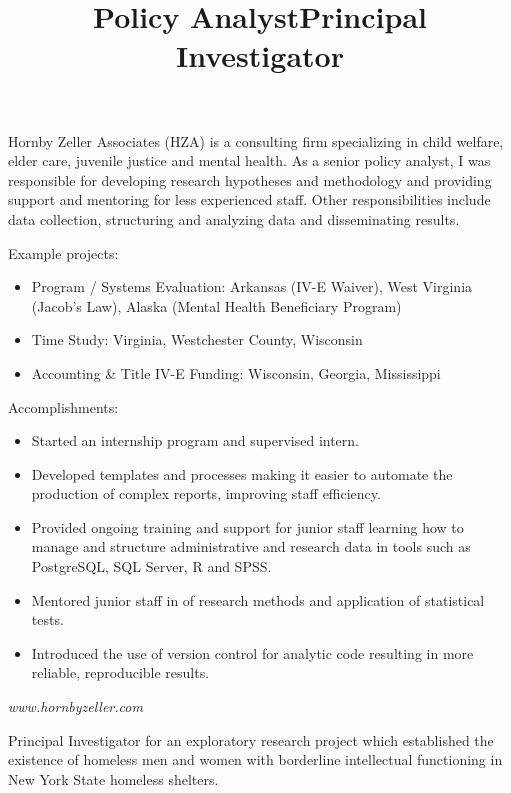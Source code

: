 \documentclass[line, margin, 10pt]{res}
\begin{document}
\begin{resume}
  \title{Policy Analyst}
  \begin{position}
    Hornby Zeller Associates (HZA) is a consulting firm specializing
    in child welfare, elder care, juvenile justice and mental
    health. As a senior policy analyst, I was responsible for
    developing research hypotheses and methodology and providing
    support and mentoring for less experienced staff. Other
    responsibilities include data collection, structuring and
    analyzing data and disseminating results.

    Example projects:
    \begin{itemize}
    \item Program / Systems Evaluation: Arkansas (IV-E Waiver), West
      Virginia (Jacob's Law), Alaska (Mental Health Beneficiary Program)
    \item Time Study: Virginia, Westchester County, Wisconsin
    \item Accounting \& Title IV-E Funding: Wisconsin, Georgia, Mississippi
    \end{itemize}

    Accomplishments:
    \begin{itemize}
    \item Started an internship program and supervised intern.
    \item Developed templates and processes making it easier to
      automate the production of complex reports, improving staff
      efficiency.
    \item Provided ongoing training and support for junior staff
      learning how to manage and structure administrative and research
      data in tools such as PostgreSQL, SQL Server, R and SPSS.
    \item Mentored junior staff in of research methods and application
      of statistical tests.
    \item Introduced the use of version control for analytic code
      resulting in more reliable, reproducible results.
    \end{itemize}
    \emph{www.hornbyzeller.com}
  \end{position}

  \title{Principal Investigator}
  \begin{position}
    Principal Investigator for an exploratory research project which
    established the existence of homeless men and women with
    borderline intellectual functioning in New York State homeless
    shelters.


\end{position}
\end{resume}
\end{document}
